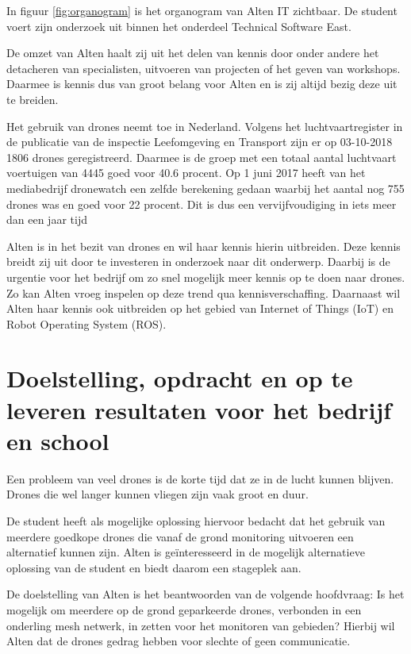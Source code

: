 \documentclass[a4paper, 11pt, oneside]{report}
\begin{document}
In figuur \ref{fig:organogram} is het organogram van Alten IT zichtbaar.
De student voert zijn onderzoek uit binnen het onderdeel Technical Software East.

De omzet van Alten haalt zij uit het delen van kennis door onder andere het detacheren van specialisten, uitvoeren van projecten of het geven van workshops.
Daarmee is kennis dus van groot belang voor Alten en is zij altijd bezig deze uit te breiden. 

Het gebruik van drones neemt toe in Nederland.
Volgens het luchtvaartregister in de publicatie van de inspectie Leefomgeving en Transport \cite{ILeT} zijn er op 03-10-2018 1806 drones geregistreerd. 
Daarmee is de groep met een totaal aantal luchtvaart voertuigen van 4445 goed voor 40.6 procent.
Op 1 juni 2017 heeft \citeauthor{aantalDrones} van het mediabedrijf dronewatch een zelfde berekening gedaan waarbij het aantal nog 755 drones was en goed voor 22 procent. Dit is dus een vervijfvoudiging in iets meer dan een jaar tijd

Alten is in het bezit van drones en wil haar kennis hierin uitbreiden.
Deze kennis breidt zij uit door te investeren in onderzoek naar dit onderwerp.
Daarbij is de urgentie voor het bedrijf om zo snel mogelijk meer kennis op te doen naar drones.
Zo kan Alten vroeg inspelen op deze trend qua kennisverschaffing.
Daarnaast wil Alten haar kennis ook uitbreiden op het gebied van Internet of Things (IoT) en Robot Operating System (ROS).

\chapter{Doelstelling, opdracht en op te leveren resultaten voor het bedrijf en school}
\label{chapter:doelstelling}

Een probleem van veel drones is de korte tijd dat ze in de lucht kunnen blijven.
Drones die wel langer kunnen vliegen zijn vaak groot en duur.

De student heeft als mogelijke oplossing hiervoor bedacht dat het gebruik van meerdere goedkope drones die vanaf de grond monitoring uitvoeren een alternatief kunnen zijn.
Alten is geïnteresseerd in de mogelijk alternatieve oplossing van de student en biedt daarom een stageplek aan.

De doelstelling van Alten is het beantwoorden van de volgende hoofdvraag: Is het mogelijk om meerdere op de grond geparkeerde drones, verbonden in een onderling mesh netwerk, in zetten voor het monitoren van gebieden?
Hierbij wil Alten dat de drones gedrag hebben voor slechte of geen communicatie.
\end{document}
